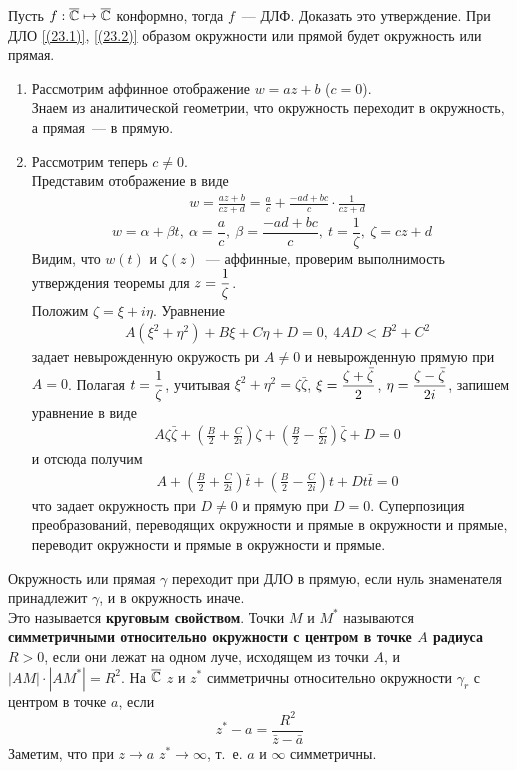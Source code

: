 \Exse
Пусть $f: \overline{\mathbb{C}} \mapsto \overline{\mathbb{C}}$ конформно, тогда $f$~--- ДЛФ. Доказать это
утверждение.
\theorem
При ДЛО \eqref{(23.1)}, \eqref{(23.2)} образом окружности или прямой будет
окружность или прямая.
\pr
~
\begin{enumerate}
    \item Рассмотрим аффинное отображение $w = az+b$ ($c = 0$).
    \\
    Знаем из аналитической геометрии, что окружность переходит в окружность, а
    прямая~--- в прямую.
    \item Рассмотрим теперь $c \neq 0$.
    \\
    Представим отображение в виде
    \begin{align*}
      & w = \frac{az+b}{cz+d} = \frac{a}{c} + \frac{-ad+bc}{c}\cdot \frac{1}{cz+d}
    \end{align*}
    \begin{equation}\label{(23.4)}
        w = \alpha + \beta t, \ \alpha = \frac{a}{c}, \ \beta = \frac{-ad+bc}{c}, \ t = \frac{1}{\zeta}, \ \zeta = cz+d
    \end{equation}
    Видим, что $w(t)$ и $\zeta(z)$~--- аффинные, проверим выполнимость
    утверждения теоремы для $z = \displaystyle \frac{1}{\zeta}$.
    \\
    Положим $\zeta = \xi + i \eta$. Уравнение
    \begin{align*}
      & A(\xi^2+\eta^2) + B\xi + C\eta + D = 0, \ 4AD < B^2+C^2
    \end{align*}
    задает невырожденную окружость ри $A \neq 0$ и невырожденную прямую при $A =
    0$. Полагая $t = \displaystyle \frac{1}{\zeta}$, учитывая $\xi^2 + \eta^2 =
    \zeta\bar{\zeta}$, $\xi = \displaystyle \frac{\zeta + \bar{\zeta}}{2}$, $\eta = \displaystyle
    \frac{\zeta - \bar{\zeta}}{2i}$, запишем уравнение в виде
    \begin{align*}
      & A\zeta\bar{\zeta} + \left( \frac{B}{2} + \frac{C}{2i}\right)\zeta + \left( \frac{B}{2} - \frac{C}{2i}\right)\bar{\zeta} + D = 0
    \end{align*}
    и отсюда получим
    \begin{align*}
      & A + \left( \frac{B}{2} + \frac{C}{2i}\right)\bar{t} + \left( \frac{B}{2} - \frac{C}{2i}\right)t + Dt\bar{t} = 0
    \end{align*}
    что задает окружность при $D \neq 0$ и прямую при $D = 0$. Суперпозиция
    преобразований, переводящих окружности и прямые в окружности и прямые,
    переводит окружности и прямые в окружности и прямые.
\end{enumerate}
\Note
Окружность или прямая $\gamma$ переходит при ДЛО в прямую, если нуль знаменателя
принадлежит $\gamma$, и в окружность иначе.
\\
Это называется \textbf{круговым свойством}.
\Def
Точки $M$ и $M^*$ называются \textbf{симметричными относительно окружности с
  центром в точке $A$ радиуса $R > 0$}, если они лежат на одном луче, исходящем
из точки $A$, и $\left| AM \right| \cdot \left| AM^* \right| = R^2$. На $\overline{\mathbb{C}}$
$z$ и $z^*$ симметричны относительно окружности $\gamma_r$ с центром в точке
$a$, если
\begin{equation}\label{(23.5)}
    z^* - a = \frac{R^2}{\bar{z} - \bar{a}}
\end{equation}
Заметим, что при $z \to a$ $z^* \to \infty$, т.~е. $a$ и $\infty$ симметричны.